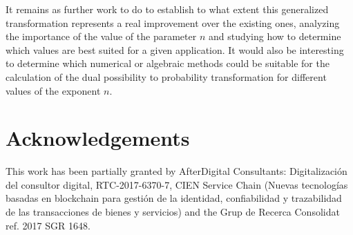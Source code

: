 \documentclass[a4paper]{article}
\begin{document}
It remains as further work to do to establish to what extent this generalized transformation represents a real improvement over the existing ones, analyzing the importance of the value of the parameter $n$ and studying how to determine which values are best suited for a given application. It would also be interesting to determine which numerical or algebraic methods could be suitable for the calculation of the dual possibility to probability transformation for different values of the exponent $n$.  

\section*{Acknowledgements}
This work has been partially granted by AfterDigital Consultants: Digitalización del consultor digital, RTC-2017-6370-7, CIEN Service Chain (Nuevas tecnologías basadas en blockchain para gestión de la identidad, confiabilidad y trazabilidad de las transacciones de bienes y servicios) and the Grup de Recerca Consolidat ref. 2017 SGR 1648. 




\end{document}
